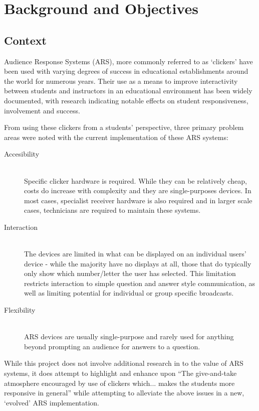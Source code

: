 \documentclass[a4papert,11pt,notitlepage]{ltxdoc}
\begin{document}
\pagebreak

\tableofcontents

\pagebreak

\section{Background and Objectives}
\subsection{Context}
Audience Response Systems (ARS), more commonly referred to as `clickers' have been used with varying degrees of success in educational establishments around the world for numerous years. Their use as a means to improve interactivity between students and instructors in an educational environment has been widely documented, with research indicating notable effects on student responsiveness, involvement and success. 

From using these clickers from a students' perspective, three primary problem areas were noted with the current implementation of these ARS systems:
\begin{description}
\item[Accesibility] \hfill \\
Specific clicker hardware is required. While they can be relatively cheap, costs do increase with complexity and they are single-purposes devices. In most cases, specialist receiver hardware is also required and in larger scale cases, technicians are required to maintain these systems.
\item[Interaction] \hfill \\
The devices are limited in what can be displayed on an individual users' device - while the majority have no displays at all, those that do typically only show which number/letter the user has selected. This limitation restricts interaction to simple question and answer style communication, as well as limiting potential for individual or group specific broadcasts.
\item[Flexibility] \hfill \\
ARS devices are usually single-purpose and rarely used for anything beyond prompting an audience for answers to a question.
\end{description}

While this project does not involve additional research in to the value of ARS systems, it does attempt to highlight and enhance upon ``The give-and-take atmosphere encouraged by use of clickers which... makes the students more responsive in general''\cite{wood:clickers} while attempting to alleviate the above issues in a new, `evolved' ARS implementation.
\end{document}

